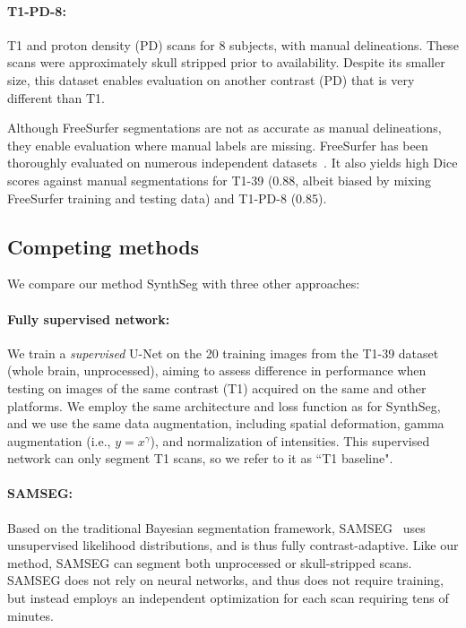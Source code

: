 \documentclass{midl}
\newcommand{\netname}{SynthSeg}
\begin{document}
\paragraph{T1-PD-8:} T1 and proton density (PD) scans for 8 subjects, with manual delineations. These scans were approximately skull stripped prior to availability. Despite its smaller size, this dataset enables evaluation on another contrast (PD) that is very different than T1. \newline

\noindent Although FreeSurfer segmentations are not as accurate as manual delineations, they enable evaluation where manual labels are missing. FreeSurfer has been thoroughly evaluated on numerous independent datasets~\cite{fischl_whole_2002, tae_validation_2008}. It also yields high Dice scores against manual segmentations for T1-39 (0.88, albeit biased by mixing FreeSurfer training and testing data) and T1-PD-8 (0.85).


\subsection{Competing methods}

We compare our method \netname{} with three other approaches:

\paragraph{Fully supervised network:} We train a \textit{supervised} U-Net on the 20 training images from the T1-39 dataset (whole brain, unprocessed), aiming to assess difference in performance when testing on images of the same contrast (T1) acquired on the same and other platforms. 
We employ the same architecture and loss function as for \netname{}, and we use the same data augmentation, including spatial deformation, gamma augmentation (i.e., $y=x^\gamma$), and normalization of intensities. This supervised network can only segment T1 scans, so we refer to it as ``T1 baseline".

\paragraph{SAMSEG:}  Based on the traditional Bayesian segmentation framework, SAMSEG~\cite{puonti_fast_2016} uses unsupervised likelihood distributions, and is thus fully contrast-adaptive. Like our method, SAMSEG can segment both unprocessed or skull-stripped scans. SAMSEG does not rely on neural networks, and thus does not require training, but instead employs an independent optimization for each scan requiring tens of minutes.
\end{document}
